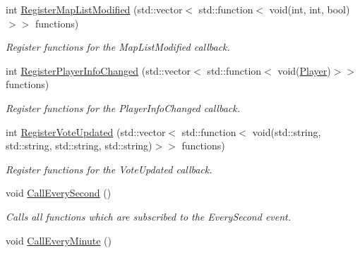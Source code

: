 \begin{DoxyCompactItemize}
int \hyperlink{classEventManager_a2793498f3b1e3bf82c9d8caab49387c0}{Register\-Map\-List\-Modified} (std\-::vector$<$ std\-::function$<$ void(int, int, bool)$>$$>$ functions)
\begin{DoxyCompactList}\small\item\em Register functions for the Map\-List\-Modified callback. \end{DoxyCompactList}\item 
int \hyperlink{classEventManager_a1ffe0d4b4a0bdbb8e488bc3bd3a58178}{Register\-Player\-Info\-Changed} (std\-::vector$<$ std\-::function$<$ void(\hyperlink{structPlayer}{Player})$>$$>$ functions)
\begin{DoxyCompactList}\small\item\em Register functions for the Player\-Info\-Changed callback. \end{DoxyCompactList}\item 
int \hyperlink{classEventManager_aa8833f57b1732204762c4d64c8546c53}{Register\-Vote\-Updated} (std\-::vector$<$ std\-::function$<$ void(std\-::string, std\-::string, std\-::string, std\-::string)$>$$>$ functions)
\begin{DoxyCompactList}\small\item\em Register functions for the Vote\-Updated callback. \end{DoxyCompactList}\item 
\hypertarget{classEventManager_a62f03057453cda9430cccd5c9e21878d}{void \hyperlink{classEventManager_a62f03057453cda9430cccd5c9e21878d}{Call\-Every\-Second} ()}\label{classEventManager_a62f03057453cda9430cccd5c9e21878d}

\begin{DoxyCompactList}\small\item\em Calls all functions which are subscribed to the Every\-Second event. \end{DoxyCompactList}\item 
\hypertarget{classEventManager_aeee2f0768556dc8eb79be47362f05c9a}{void \hyperlink{classEventManager_aeee2f0768556dc8eb79be47362f05c9a}{Call\-Every\-Minute} ()}\label{classEventManager_aeee2f0768556dc8eb79be47362f05c9a}


\end{DoxyCompactItemize}
